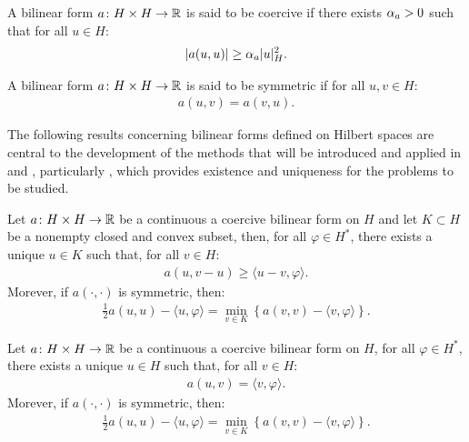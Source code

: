 \begin{definition}
    A bilinear form $a \colon H \times H \rightarrow \mathbb{R}$ is said to be coercive if there exists $\alpha_{a} > 0$ such that for all $u \in H$:
    \begin{align}
        \lvert a(u, u) \rvert \geq \alpha_{a} \lvert u \rvert_H^2.
    \end{align}
\end{definition}

\begin{definition}
    A bilinear form $a \colon H \times H \rightarrow \mathbb{R}$ is said to be symmetric if for all $u, v \in H$:
    \begin{align}
        a(u, v) = a(v, u).
    \end{align}
\end{definition}

The following results concerning bilinear forms defined on Hilbert spaces are central to the development of the methods that will be introduced and applied in  and , particularly , which provides existence and uniqueness for the problems to be studied.

\begin{theorem}[Stampacchia]
    Let $a \colon H \times H \rightarrow \mathbb{R}$ be a continuous a coercive bilinear form on $H$ and let $K \subset H$ be a nonempty closed and convex subset, then, for all $\varphi \in H^*$, there exists a unique $u \in K$ such that, for all $v \in H$:
    \begin{align}
        a(u, v - u) \geq \langle u - v, \varphi \rangle.
    \end{align}
    Morever, if $a(\cdot, \cdot)$ is symmetric, then:
    \begin{align}
        \frac{1}{2} a(u, u) - \langle u, \varphi \rangle = \min_{v \in K} \left\{ a(v, v) - \langle v, \varphi \rangle \right\}.
    \end{align}
\end{theorem}

\begin{corollary} \label{theorem:lm}
    Let $a \colon H \times H \rightarrow \mathbb{R}$ be a continuous a coercive bilinear form on $H$, for all $\varphi \in H^*$, there exists a unique $u \in H$ such that, for all $v \in H$:
    \begin{align}
        a(u, v) = \langle v, \varphi \rangle.
    \end{align}
    Morever, if $a(\cdot, \cdot)$ is symmetric, then:
    \begin{align}
        \frac{1}{2} a(u, u) - \langle u, \varphi \rangle = \min_{v \in K} \left\{ a(v, v) - \langle v, \varphi \rangle \right\}.
    \end{align}
\end{corollary}

